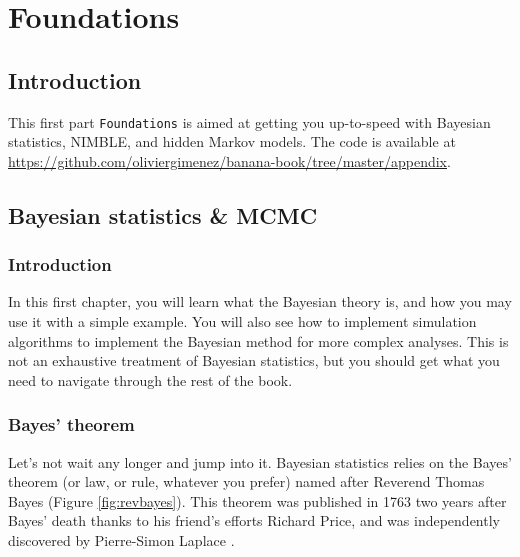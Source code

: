 \documentclass[
  12pt,
]{krantz}
\begin{document}
\mainmatter

\part{Foundations}\label{part-foundations}

\chapter*{Introduction}\label{introduction}


This first part \texttt{Foundations} is aimed at getting you up-to-speed with Bayesian statistics, NIMBLE, and hidden Markov models. The code is available at \url{https://github.com/oliviergimenez/banana-book/tree/master/appendix}.

\chapter{Bayesian statistics \& MCMC}\label{crashcourse}

\section{Introduction}\label{introduction-1}

In this first chapter, you will learn what the Bayesian theory is, and how you may use it with a simple example. You will also see how to implement simulation algorithms to implement the Bayesian method for more complex analyses. This is not an exhaustive treatment of Bayesian statistics, but you should get what you need to navigate through the rest of the book.

\section{Bayes' theorem}\label{bayes-theorem}

Let's not wait any longer and jump into it. Bayesian statistics relies on the Bayes' theorem (or law, or rule, whatever you prefer) named after Reverend Thomas Bayes (Figure \ref{fig:revbayes}). This theorem was published in 1763 two years after Bayes' death thanks to his friend's efforts Richard Price, and was independently discovered by Pierre-Simon Laplace \citep{mcgrayne2011}.
\end{document}
